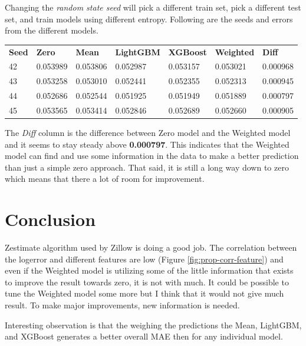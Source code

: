 \documentclass[a4paper]{article}
\begin{document}
Changing the \textit{random state seed} will pick a different train set, pick a different test set, and train models
using different entropy. Following are the seeds and errors from the different models.
\begin{center}
\begin{tabular}{ l l l l l l l }
    \textbf{Seed} & \textbf{Zero} & \textbf{Mean} & \textbf{LightGBM} & \textbf{XGBoost} & \textbf{Weighted} & \textbf{Diff} \\
    42 & 0.053989 & 0.053806 & 0.052987 & 0.053157 & 0.053021 & 0.000968 \\
    43 & 0.053258 & 0.053010 & 0.052441 & 0.052355 & 0.052313 & 0.000945 \\
    44 & 0.052686 & 0.052544 & 0.051925 & 0.051949 & 0.051889 & 0.000797 \\
    45 & 0.053565 & 0.053414 & 0.052846 & 0.052689 & 0.052660 & 0.000905 \\
\end{tabular}
\end{center}
The \textit{Diff} column is the difference between Zero model and the Weighted model and it seems to stay steady above
\textbf{0.000797}. This indicates that the Weighted model can find and use some information in the data to
make a better prediction than just a simple zero approach. That said, it is still a long way down
to zero which means that there a lot of room for improvement.

\section{Conclusion}
Zestimate algorithm used by Zillow is doing a good job. The correlation between the logerror and
different features are low (Figure \ref{fig:prop-corr-feature}) and even if the Weighted model is utilizing
some of the little information that exists to improve the result towards zero, it is not with much.
It could be possible to tune the Weighted model some more but I think that it would not give much result.
To make major improvements, new information is needed.

Interesting observation is that the weighing the predictions the Mean, LightGBM, and XGBoost generates a
better overall MAE then for any individual model.


\end{document}

